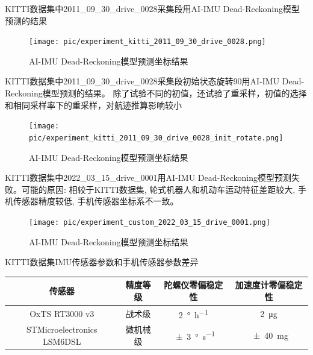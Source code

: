 \documentclass{beamer} %
\begin{document}
\begin{frame}
    KITTI数据集中2011\_09\_30\_drive\_0028采集段用AI-IMU Dead-Reckoning模型预测的结果
    \begin{figure}[htbp]
        \centering
        \texttt{[image: pic/experiment\_kitti\_2011\_09\_30\_drive\_0028.png]}
        \caption{AI-IMU Dead-Reckoning模型预测坐标结果}
    \end{figure}
\end{frame}

\begin{frame}
     KITTI数据集中2011\_09\_30\_drive\_0028采集段初始状态旋转90用AI-IMU Dead-Reckoning模型预测的结果。 除了试验不同的初值，还试验了重采样，初值的选择和相同采样率下的重采样，对航迹推算影响较小
    \begin{figure}[htbp]
        \centering
        \texttt{[image: pic/experiment\_kitti\_2011\_09\_30\_drive\_0028\_init\_rotate.png]}
        \caption{AI-IMU Dead-Reckoning模型预测坐标结果}
    \end{figure}
\end{frame}

\begin{frame}
    KITTI数据集中2022\_03\_15\_drive\_0001用AI-IMU Dead-Reckoning模型预测失败。可能的原因: 相较于KITTI数据集, 轮式机器人和机动车运动特征差距较大, 手机传感器精度较低, 手机传感器坐标系不一致。
   \begin{figure}[htbp]
       \centering
       \texttt{[image: pic/experiment\_custom\_2022\_03\_15\_drive\_0001.png]}
       \caption{AI-IMU Dead-Reckoning模型预测坐标结果}
   \end{figure}
\end{frame}

\begin{frame}{KITTI数据集IMU传感器参数和手机传感器参数差异}
    \begin{table}
        \tiny
        \begin{tabular}{cccc}
            \toprule
            传感器 & 精度等级 & 陀螺仪零偏稳定性 & 加速度计零偏稳定性\\
            \midrule
            OxTS RT3000 v3             & 战术级   & \qty{2}{\degree\per\hour}       & \qty{2}{\ug} \\
            STMicroelectronics LSM6DSL & 微机械级 & \qty{\pm 3}{\degree\per\second} & \qty{\pm 40}{\mg} \\
            \bottomrule
        \end{tabular}
    \end{table}
\end{frame}
\end{document}
